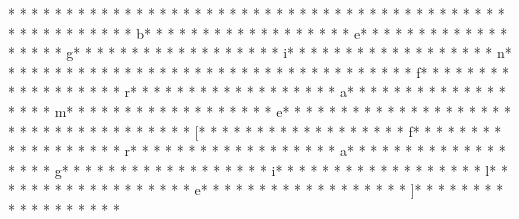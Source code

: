 * * *  * * *  * * *  *  * * *  *  * * *  * 
* * *  * * *  * * *  *  * * *  *  * * *  * 
* * *  * * *  * * *  *  * * *  *  * * *  * b* * *  * * *  * * *  *  * * *  *  * * *  * e* * *  * * *  * * *  *  * * *  *  * * *  * g* * *  * * *  * * *  *  * * *  *  * * *  * i* * *  * * *  * * *  *  * * *  *  * * *  * n* * *  * * *  * * *  *  * * *  *  * * *  * {* * *  * * *  * * *  *  * * *  *  * * *  * f* * *  * * *  * * *  *  * * *  *  * * *  * r* * *  * * *  * * *  *  * * *  *  * * *  * a* * *  * * *  * * *  *  * * *  *  * * *  * m* * *  * * *  * * *  *  * * *  *  * * *  * e* * *  * * *  * * *  *  * * *  *  * * *  * }* * *  * * *  * * *  *  * * *  *  * * *  * [* * *  * * *  * * *  *  * * *  *  * * *  * f* * *  * * *  * * *  *  * * *  *  * * *  * r* * *  * * *  * * *  *  * * *  *  * * *  * a* * *  * * *  * * *  *  * * *  *  * * *  * g* * *  * * *  * * *  *  * * *  *  * * *  * i* * *  * * *  * * *  *  * * *  *  * * *  * l* * *  * * *  * * *  *  * * *  *  * * *  * e* * *  * * *  * * *  *  * * *  *  * * *  * ]* * *  * * *  * * *  *  * * *  *  * * *  * 
